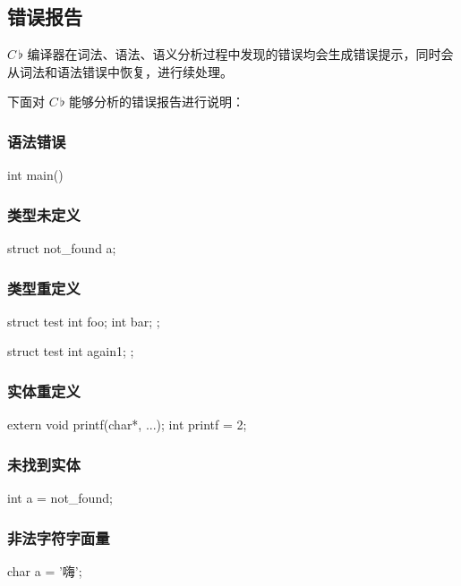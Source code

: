 \documentclass{ctexrep}
\newcommand{\cb}{$C\,\flat$\xspace}
\begin{document}
\subsection{错误报告}
\cb 编译器在词法、语法、语义分析过程中发现的错误均会生成错误提示，同时会从词法和语法错误中恢复，进行续处理。

下面对 \cb 能够分析的错误报告进行说明：

\subsubsection{语法错误}

\begin{runcompiler}
int main(){}
\end{runcompiler}
\subsubsection{类型未定义}
\begin{runcompiler}
struct not_found a;
\end{runcompiler}
\subsubsection{类型重定义}
\begin{runcompiler}
struct test {
    int foo;
    int bar;
};

struct test {
    int again1;
};
\end{runcompiler}

\subsubsection{实体重定义}

\begin{runcompiler}
extern void printf(char*, ...);
int printf = 2;
\end{runcompiler}

\subsubsection{未找到实体}
\begin{runcompiler}
int a = not_found;
\end{runcompiler}
\subsubsection{非法字符字面量}
\begin{runcompiler}
char a = '嗨';
\end{runcompiler}
\end{document}
